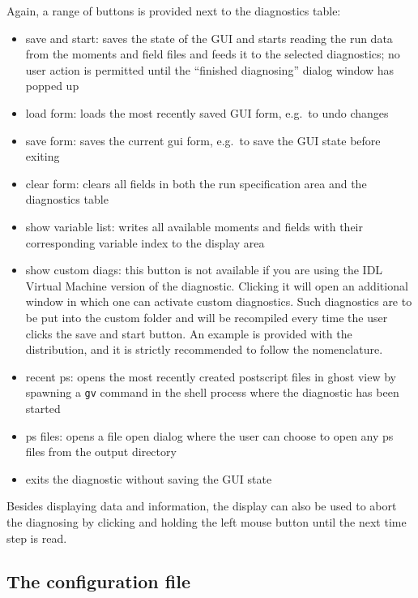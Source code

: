 \documentclass[12pt]{article}
\begin{document}
Again, a range of buttons is provided next to the diagnostics
table:
\begin{itemize}
\item save and start: saves the state of the GUI and starts
reading the run data from the moments and field files and feeds it
to the selected diagnostics; no user action is permitted until the
``finished diagnosing'' dialog window has popped up
\item load form: loads the most recently saved GUI form,
e.g.~to undo changes
\item save form: saves the current gui form, e.g.~to save the GUI
state before exiting
\item clear form: clears all fields in both
the run specification area and the diagnostics table
\item show
variable list: writes all available moments and fields with their
corresponding variable index to the display area
\item show custom diags: this button is not available if you
are using the IDL
Virtual Machine version of the \gene diagnostic. Clicking it will
open an additional window in which one can activate custom
diagnostics. Such diagnostics are to be put into the custom folder
and will be recompiled every time the user clicks the save and
start button. An example is provided with the distribution, and it
is strictly recommended to follow the nomenclature.
\item recent ps: opens the most recently created postscript
files in ghost view
by spawning a \verb|gv| command in the shell process where the
diagnostic has been started
\item ps files: opens a file open dialog where the user can
choose to open any ps files from the
output directory
\item exits the diagnostic without saving the GUI state
\end{itemize}

Besides displaying data and information, the display can also
be used to abort the diagnosing by clicking and holding the left
mouse button until the next time step is read.

\subsection{The configuration file}
\end{document}
